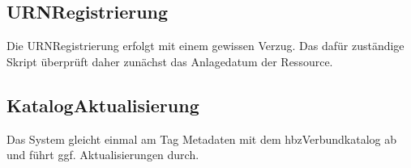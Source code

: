 \documentclass[letterpaper,10pt,english]{sphinxmanual}
\begin{document}
\subsection{URN\sphinxhyphen{}Registrierung}
\label{\detokenize{toscience:urn-registrierung}}\label{\detokenize{toscience:id77}}
\sphinxAtStartPar
Die URN\sphinxhyphen{}Registrierung erfolgt mit einem gewissen Verzug. Das dafür
zuständige Skript überprüft daher zunächst das Anlagedatum der
Ressource.

\begin{sphinxVerbatim}[commandchars=\\\{\}]
         
        
        
\end{sphinxVerbatim}


\subsection{Katalog\sphinxhyphen{}Aktualisierung}
\label{\detokenize{toscience:katalog-aktualisierung}}\label{\detokenize{toscience:id78}}
\sphinxAtStartPar
Das System gleicht einmal am Tag Metadaten mit dem hbz\sphinxhyphen{}Verbundkatalog ab
und führt ggf. Aktualisierungen durch.
\end{document}
